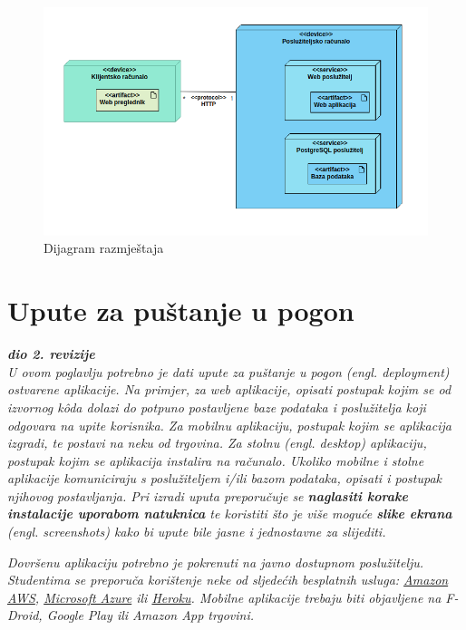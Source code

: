 \begin{figure}[H]
	\centering
	\includegraphics[width=\textwidth, scale=0.5]{dijagrami/dijagram_razmjestaja}
	\caption{Dijagram razmještaja}
	\label{fig:dijagram_razmještaja}
\end{figure}
			
			
			\eject 
		
		\section{Upute za puštanje u pogon}
		
			\textbf{\textit{dio 2. revizije}}\\
		
			 \textit{U ovom poglavlju potrebno je dati upute za puštanje u pogon (engl. deployment) ostvarene aplikacije. Na primjer, za web aplikacije, opisati postupak kojim se od izvornog kôda dolazi do potpuno postavljene baze podataka i poslužitelja koji odgovara na upite korisnika. Za mobilnu aplikaciju, postupak kojim se aplikacija izgradi, te postavi na neku od trgovina. Za stolnu (engl. desktop) aplikaciju, postupak kojim se aplikacija instalira na računalo. Ukoliko mobilne i stolne aplikacije komuniciraju s poslužiteljem i/ili bazom podataka, opisati i postupak njihovog postavljanja. Pri izradi uputa preporučuje se \textbf{naglasiti korake instalacije uporabom natuknica} te koristiti što je više moguće \textbf{slike ekrana} (engl. screenshots) kako bi upute bile jasne i jednostavne za slijediti.}
			
			
			 \textit{Dovršenu aplikaciju potrebno je pokrenuti na javno dostupnom poslužitelju. Studentima se preporuča korištenje neke od sljedećih besplatnih usluga: \href{https://aws.amazon.com/}{Amazon AWS}, \href{https://azure.microsoft.com/en-us/}{Microsoft Azure} ili \href{https://www.heroku.com/}{Heroku}. Mobilne aplikacije trebaju biti objavljene na F-Droid, Google Play ili Amazon App trgovini.}
			
			
			\eject 